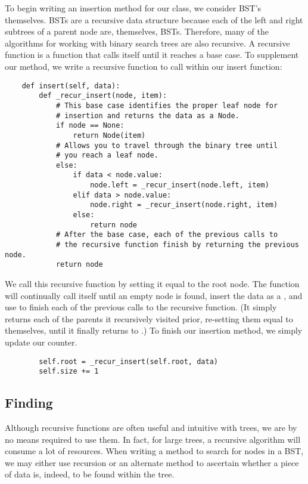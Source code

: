 To begin writing an insertion method for our  class, we consider BST's themselves.
BSTs are a recursive data structure because each of the left and right subtrees of a parent node are, themselves, BSTs.
Therefore, many of the algorithms for working with binary search trees are also recursive.
A recursive function is a function that calls itself until it reaches a base case.
To supplement our  method, we write a recursive function to call within our insert function:
\begin{lstlisting}
    def insert(self, data):
        def _recur_insert(node, item):
            # This base case identifies the proper leaf node for
            # insertion and returns the data as a Node.
            if node == None:
                return Node(item)
            # Allows you to travel through the binary tree until
            # you reach a leaf node.
            else:
                if data < node.value:
                    node.left = _recur_insert(node.left, item)
                elif data > node.value:
                    node.right = _recur_insert(node.right, item)
                else:
                    return node
            # After the base case, each of the previous calls to
            # the recursive function finish by returning the previous node.
            return node
\end{lstlisting}
We call this recursive function by setting it equal to the root node.
The function will continually call itself until an empty node is found, insert the data as a , and use  to finish each of the previous calls to the recursive function. (It simply returns each of the parents it recursively visited prior, re-setting them equal to themselves, until it finally returns to .) To finish our insertion method, we simply update our counter.
\begin{lstlisting}
        self.root = _recur_insert(self.root, data)
        self.size += 1
\end{lstlisting}


\subsection*{Finding}
Although recursive functions are often useful and intuitive with trees, we  are by no means required to use them. In fact, for large trees, a recursive algorithm will consume a lot of resources. When writing a method to search for nodes in a BST, we may either use recursion or an alternate method to ascertain whether a piece of data is, indeed, to be found within the tree.

